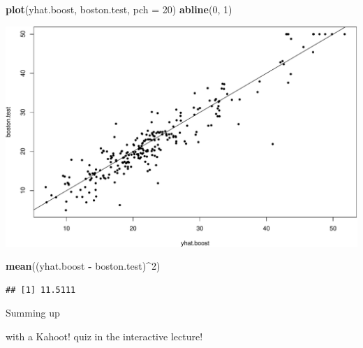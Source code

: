\documentclass[ignorenonframetext,]{beamer}
\newenvironment{Shaded}{\begin{snugshade}}{\end{snugshade}}
\newcommand{\KeywordTok}[1]{\textcolor[rgb]{0.13,0.29,0.53}{\textbf{#1}}}
\newcommand{\DataTypeTok}[1]{\textcolor[rgb]{0.13,0.29,0.53}{#1}}
\newcommand{\DecValTok}[1]{\textcolor[rgb]{0.00,0.00,0.81}{#1}}
\newcommand{\StringTok}[1]{\textcolor[rgb]{0.31,0.60,0.02}{#1}}
\newcommand{\OperatorTok}[1]{\textcolor[rgb]{0.81,0.36,0.00}{\textbf{#1}}}
\newcommand{\NormalTok}[1]{#1}
\begin{document}
\begin{frame}[fragile]

\begin{Shaded}
\begin{Highlighting}[]
\KeywordTok{plot}\NormalTok{(yhat.boost, boston.test, }\DataTypeTok{pch =} \DecValTok{20}\NormalTok{)}
\KeywordTok{abline}\NormalTok{(}\DecValTok{0}\NormalTok{, }\DecValTok{1}\NormalTok{)}
\end{Highlighting}
\end{Shaded}

\includegraphics{8TreesBEAMER_files/figure-beamer/unnamed-chunk-50-1.pdf}

\begin{Shaded}
\begin{Highlighting}[]
\KeywordTok{mean}\NormalTok{((yhat.boost }\OperatorTok{-}\StringTok{ }\NormalTok{boston.test)}\OperatorTok{^}\DecValTok{2}\NormalTok{)}
\end{Highlighting}
\end{Shaded}

\begin{verbatim}
## [1] 11.5111
\end{verbatim}

\end{frame}

\begin{frame}{Summing up }

with a Kahoot! quiz in the interactive lecture!

\end{frame}
\end{document}
